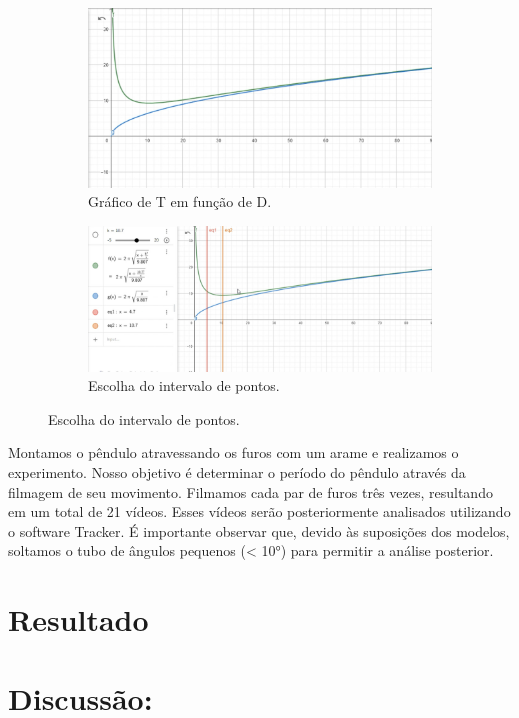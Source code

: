 \documentclass[hidelinks,a4paper,12pt]{article}
\begin{document}
\begin{figure}[H]
    \begin{subfigure}{0.5\textwidth }
        \centering
        \includegraphics[width=0.9\linewidth]{grafico1.png}
        \caption{Gráfico de T em função de D.}
        \label{fig:1.2}
    \end{subfigure}%
    \begin{subfigure}{0.5\textwidth }
        \centering
        \includegraphics[width=0.9\linewidth]{grafico2.png}
        \caption{Escolha do intervalo de pontos.}
        \label{fig: 1.3}
    \end{subfigure}
 \end{figure}

\qquad Montamos o pêndulo atravessando os furos com um arame e realizamos o experimento. Nosso objetivo é determinar o período do pêndulo através da filmagem de seu movimento. Filmamos cada par de furos três vezes, resultando em um total de 21 vídeos. Esses vídeos serão posteriormente analisados utilizando o software Tracker. É importante observar que, devido às suposições dos modelos, soltamos o tubo de ângulos pequenos (< 10°) para permitir a análise posterior.

\section*{Resultado}
\section*{Discussão:}
\end{document}
